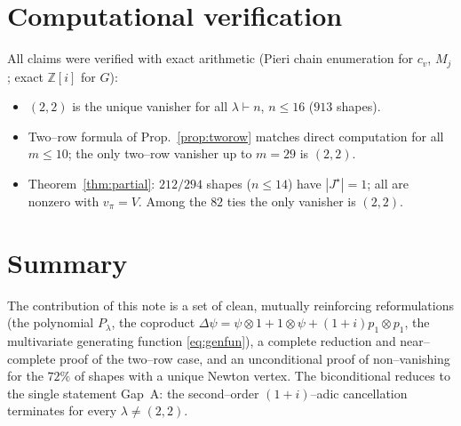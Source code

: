 \documentclass[11pt]{article}
\theoremstyle{definition}
\newcommand{\la}{\lambda}
\newcommand{\Z}{\mathbb{Z}}
\begin{document}
\section{Computational verification}
All claims were verified with exact arithmetic (Pieri chain enumeration for $c_v$,
$M_j$; exact $\Z[i]$ for $G$):
\begin{itemize}
\item $(2,2)$ is the unique vanisher for all $\la\vdash n$, $n\le16$ ($913$ shapes).
\item Two--row formula of Prop.~\ref{prop:tworow} matches direct computation for all
$m\le10$; the only two--row vanisher up to $m=29$ is $(2,2)$.
\item Theorem~\ref{thm:partial}: $212/294$ shapes ($n\le14$) have $|J^\star|=1$;
all are nonzero with $v_\pi=V$.  Among the $82$ ties the only vanisher is $(2,2)$.
\end{itemize}

\section*{Summary}
The contribution of this note is a set of clean, mutually reinforcing
reformulations (the polynomial $P_\la$, the coproduct
$\Delta\psi=\psi\otimes1+1\otimes\psi+(1+i)p_1\otimes p_1$, the multivariate
generating function \eqref{eq:genfun}), a complete reduction and near--complete
proof of the two--row case, and an unconditional proof of non--vanishing for the
$72\%$ of shapes with a unique Newton vertex.  The biconditional reduces to the
single statement Gap~A: the second--order $(1+i)$--adic cancellation terminates for
every $\la\ne(2,2)$.
\end{document}
